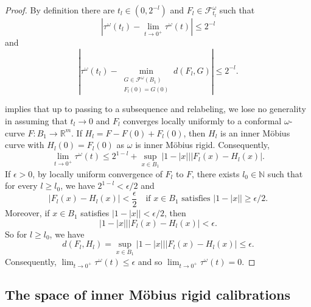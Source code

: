 \documentclass[a4paper,leqno,11pt]{amsart}
\numberwithin{equation}{section}
\theoremstyle{remark}
\theoremstyle{remark}
\begin{document}
\begin{proof}
By definition there are $t_l \in (0, 2^{-l})$ and $F_l \in \mathcal{F}^{ \omega }_{ t_l }$ such that
\[
    | \tau^{\omega}( t_l ) - \lim_{ t \rightarrow 0^{+} } \tau^{\omega}( t ) | \leq 2^{-l}
\]
and
\[
| \tau^{\omega}( t_l ) - \min_{ \substack{G \in \mathcal{F}^{\omega}( B_1 ) \\ F_l(0) = G(0)} }
    d( F_l, G ) | \leq 2^{-l}.
\]

 implies that up to passing to a subsequence and relabeling, we lose no generality in assuming that $t_l \rightarrow 0$ and $F_l$ converges locally uniformly to a conformal $\omega$-curve $F \colon B_1 \to \mathbb{R}^m$. If $H_l = F - F(0) + F_{l}(0)$, then $H_l$ is an inner Möbius curve with $H_l(0) = F_l(0)$ as $\omega$ is inner Möbius rigid. Consequently,
\begin{equation*}
    \lim_{ t \rightarrow 0^{+} } \tau^{\omega}( t )
    \leq
    2^{ 1 - l }
    +
    \sup_{ x \in B_1 } | 1 - |x| | | F_l(x) - H_l(x) |.
\end{equation*}
If $\epsilon > 0$, by locally uniform convergence of $F_l$ to $F$, there exists $l_0 \in \mathbb{N}$ such that for every $l \geq l_0$, we have $2^{1-l} < \epsilon/2$ and
\begin{equation*}
    | F_l(x) - H_l(x) | < \frac{ \epsilon }{ 2 } \quad\text{if $x \in B_1$ satisfies $| 1 - |x| | \geq \epsilon/2$.}
\end{equation*}
Moreover, if $x \in B_1$ satisfies $| 1 - |x| | < \epsilon/2$, then
\begin{equation*}
    | 1 - |x| | | F_l(x) - H_l(x) | < \epsilon.
\end{equation*}
So for $l \geq l_0$, we have
\begin{equation*}
    d( F_l, H_l ) = \sup_{ x \in B_1 } | 1 - |x| | | F_l(x) - H_l(x) | \leq \epsilon.
\end{equation*}
Consequently, $\lim_{ t \rightarrow 0^{+} } \tau^{\omega}( t ) \leq \epsilon$ and so $\lim_{ t \rightarrow 0^{+} } \tau^{\omega}( t ) = 0$.
\end{proof}





\subsection{The space of inner Möbius rigid calibrations}
\label{sec:HPP:structure}
\end{document}
